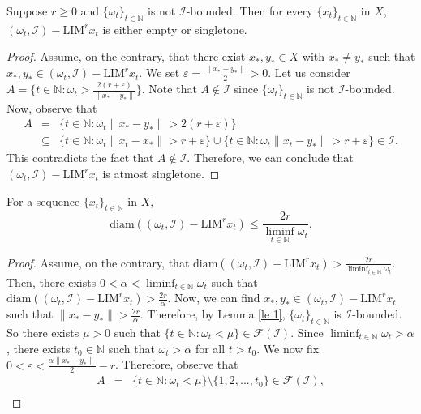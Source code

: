 \documentclass[reqno]{amsart}
\begin{document}
{\begin{lemma}\label{le 1}
Suppose $r\geq 0$ and $\{\omega_t\}_{t\in\mathbb{N}}$ is not $\mathcal{I}$-bounded. Then for every $\{x_t\}_{t\in\mathbb{N}}$ in $X$, $(\omega_t,\mathcal{I})-\text{LIM}^r x_t$ is either empty or singletone.
\end{lemma}
\begin{proof}
	Assume, on the contrary, that there exist $x_*,y_*\in X$ with $x_*\neq y_*$ such that $x_*,y_*\in (\omega_t,\mathcal{I})-\text{LIM}^r x_t$. We set $\varepsilon=\frac{\|x_*-y_*\|}{2}>0$. Let us consider $A=\{t\in\mathbb{N}:\omega_t>\frac{2(r+\varepsilon)}{\|x_*-y_*\|}\}$. Note that  $A\notin\mathcal{I}$ since  $\{\omega_t\}_{t\in\mathbb{N}}$ is not $\mathcal{I}$-bounded. Now, observe that
	\begin{eqnarray*}
		A&=&\{t\in\mathbb{N}:\omega_t\|x_*-y_*\|>2(r+\varepsilon)\}\\
		&\subseteq& \{t\in\mathbb{N}:\omega_t\|x_t-x_*\|>r+\varepsilon\}\cup \{t\in\mathbb{N}:\omega_t\|x_t-y_*\|>r+\varepsilon\}\in\mathcal{I}.
	\end{eqnarray*}
This contradicts the fact that $A\notin\mathcal{I}$. Therefore, we can conclude that  $(\omega_t,\mathcal{I})-\text{LIM}^r x_t$ is atmost singletone.
\end{proof}
\begin{lemma}\label{le 2}
For a sequence $\{x_t\}_{t\in\mathbb{N}}$ in $X$,
$$
\mbox{diam}((\omega_t,\mathcal{I})-\text{LIM}^r x_t)\leq \frac{2r}{\displaystyle\liminf_{t\in\mathbb{N}}\omega_t}.
$$
\end{lemma}
\begin{proof}
	Assume, on the contrary, that $\mbox{diam}((\omega_t,\mathcal{I})-\text{LIM}^r x_t)> \frac{2r}{\displaystyle\liminf_{t\in\mathbb{N}}\omega_t}$. Then, there exists $0<\alpha<\displaystyle\liminf_{t\in\mathbb{N}}\omega_t$ such that $\mbox{diam}((\omega_t,\mathcal{I})-\text{LIM}^r x_t)> \frac{2r}{\alpha}$. Now, we can find $x_*,y_*\in (\omega_t,\mathcal{I})-\text{LIM}^r x_t$ such that $\|x_*-y_*\|>\frac{2r}{\alpha}$. Therefore, by Lemma \ref{le 1}, $\{\omega_t\}_{t\in\mathbb{N}}$ is $\mathcal{I}$-bounded. So there exists $\mu>0$ such that $\{t\in\mathbb{N}:\omega_t<\mu\}\in\mathcal{F}(\mathcal{I})$. Since $\displaystyle\liminf_{t\in\mathbb{N}}\omega_t>\alpha$, there exists $t_0\in\mathbb{N}$ such  that $\omega_t>\alpha$ for all $t>t_0$. We now fix $0<\varepsilon< \frac{\alpha\|x_*-y_*\|}{2}-r$.   Therefore, observe that
	\begin{eqnarray*}
	A&=&\{t\in\mathbb{N}:\omega_t<\mu\}\setminus\{1,2,...,t_0\}\in \mathcal{F}(\mathcal{I}),\\

\end{eqnarray*}
\end{proof}}
\end{document}
